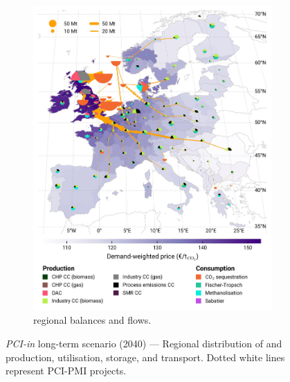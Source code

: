 \documentclass[preprint,12pt,sort&compress]{elsarticle}
\begin{document}
\begin{figure}[htbp]
\begin{subfigure}[t]{0.49\textwidth}
      \includegraphics[width=1\textwidth]{maps/pcipmi-national-international-expansion/base_s_adm___2040-balance_map_co2_stored} 
      \vspace{-0.7cm}
      \caption{ regional balances and flows.}
      \label{fig:PCI-in_lt_2040_co2}
  \end{subfigure}
  \caption{\textit{PCI-in} long-term scenario (2040) --- Regional distribution of  and  production, utilisation, storage, and transport. Dotted white lines represent PCI-PMI projects.}
  \label{fig:PCI-in_lt_2040}
\end{figure}
\end{document}
